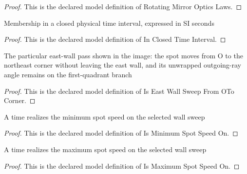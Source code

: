 \begin{proof}
  This is the declared model definition of Rotating Mirror Optics Laws.
\end{proof}
\begin{definition}
  \label{def:physics:phyx-mini-0025:phyxminiproblems-problemphyxmini0025-inclosedtimeinterval}
  Membership in a closed physical time interval, expressed in SI seconds
\end{definition}
\begin{proof}
  This is the declared model definition of In Closed Time Interval.
\end{proof}
\begin{definition}
  \label{def:physics:phyx-mini-0025:phyxminiproblems-problemphyxmini0025-iseastwallsweepfromotocorner}
  The particular east-wall pass shown in the image: the spot moves from O to the northeast corner without leaving the east wall, and its unwrapped outgoing-ray angle remains on the first-quadrant branch
\end{definition}
\begin{proof}
  This is the declared model definition of Is East Wall Sweep From OTo Corner.
\end{proof}
\begin{definition}
  \label{def:physics:phyx-mini-0025:phyxminiproblems-problemphyxmini0025-isminimumspotspeedon}
  A time realizes the minimum spot speed on the selected wall sweep
\end{definition}
\begin{proof}
  This is the declared model definition of Is Minimum Spot Speed On.
\end{proof}
\begin{definition}
  \label{def:physics:phyx-mini-0025:phyxminiproblems-problemphyxmini0025-ismaximumspotspeedon}
  A time realizes the maximum spot speed on the selected wall sweep
\end{definition}
\begin{proof}
  This is the declared model definition of Is Maximum Spot Speed On.
\end{proof}
